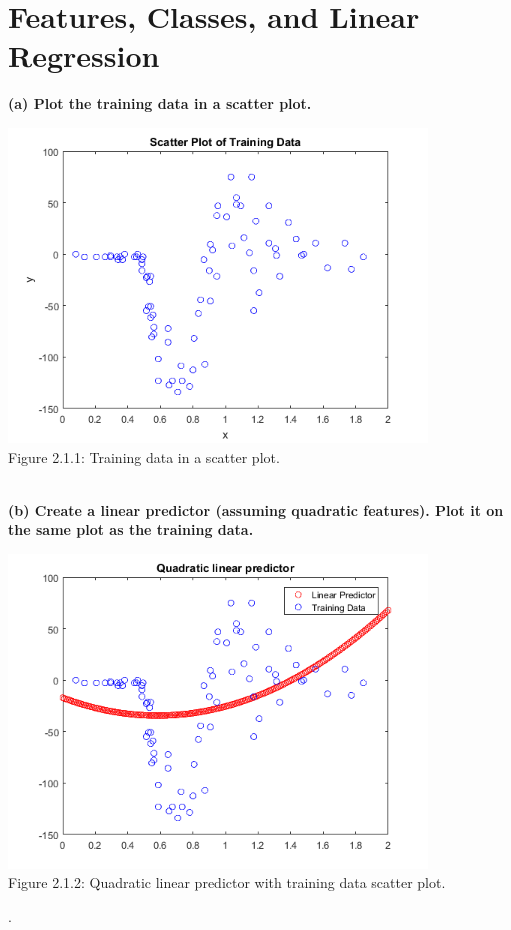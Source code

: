 \documentclass[]{report}   %
\begin{document}
\section{Features, Classes, and Linear Regression}
{\bf (a) Plot the training data in a scatter plot.}
\begin{center}
	\includegraphics[width=30em,keepaspectratio]{2_1_Figure_1.png}\\
	{Figure 2.1.1: Training data in a scatter plot.}
\end{center} 
~\\
{\bf (b) Create a linear predictor (assuming quadratic features). Plot it on the same plot as the training data.}
\begin{center}
	\includegraphics[width=30em,keepaspectratio]{2_1_Figure_2.png}\\
	{Figure 2.1.2: Quadratic linear predictor with training data scatter plot.}
\end{center}.
~\\ 
\end{document}
